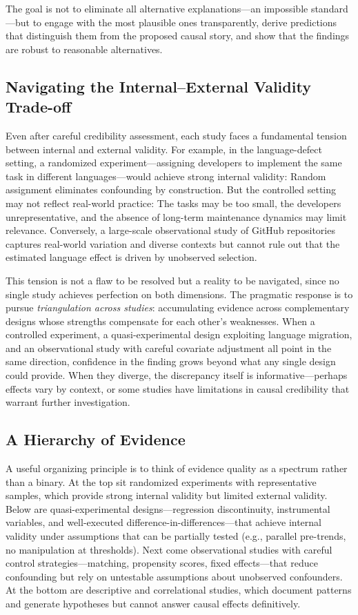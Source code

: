 %
The goal is not to eliminate all alternative explanations---an impossible standard---but to engage with the most plausible ones transparently, derive predictions that distinguish them from the proposed causal story, and show that the findings are robust to reasonable alternatives.

\subsection{Navigating the Internal--External Validity Trade-off}
\label{sec:tradeoff}

Even after careful credibility assessment, each study faces a fundamental tension between internal and external validity. 
For example, in the language-defect setting, a randomized experiment---assigning developers to implement the same task in different languages---would achieve strong internal validity: Random assignment eliminates confounding by construction.
But the controlled setting may not reflect real-world practice: The tasks may be too small, the developers unrepresentative, and the absence of long-term maintenance dynamics may limit relevance.
Conversely, a large-scale observational study of GitHub repositories captures real-world variation and diverse contexts but cannot rule out that the estimated language effect is driven by unobserved selection.

This tension is not a flaw to be resolved but a reality to be navigated, since no single study achieves perfection on both dimensions.
The pragmatic response is to pursue \emph{triangulation across studies}: accumulating evidence across complementary designs whose strengths compensate for each other's weaknesses.
When a controlled experiment, a quasi-experimental design exploiting language migration, and an observational study with careful covariate adjustment all point in the same direction, confidence in the finding grows beyond what any single design could provide.
When they diverge, the discrepancy itself is informative—perhaps effects vary by context, or some studies have limitations in causal credibility that warrant further investigation.

\subsection{A Hierarchy of Evidence}

A useful organizing principle is to think of evidence quality as a spectrum rather than a binary.
At the top sit randomized experiments with representative samples, which provide strong internal validity but limited external validity.
Below are quasi-experimental designs---regression discontinuity, instrumental variables, and well-executed difference-in-differences---that achieve internal validity under assumptions that can be partially tested (e.g., parallel pre-trends, no manipulation at thresholds).
Next come observational studies with careful control strategies---matching, propensity scores, fixed effects---that reduce confounding but rely on untestable assumptions about unobserved confounders.
At the bottom are descriptive and correlational studies, which document patterns and generate hypotheses but cannot answer causal effects definitively.

